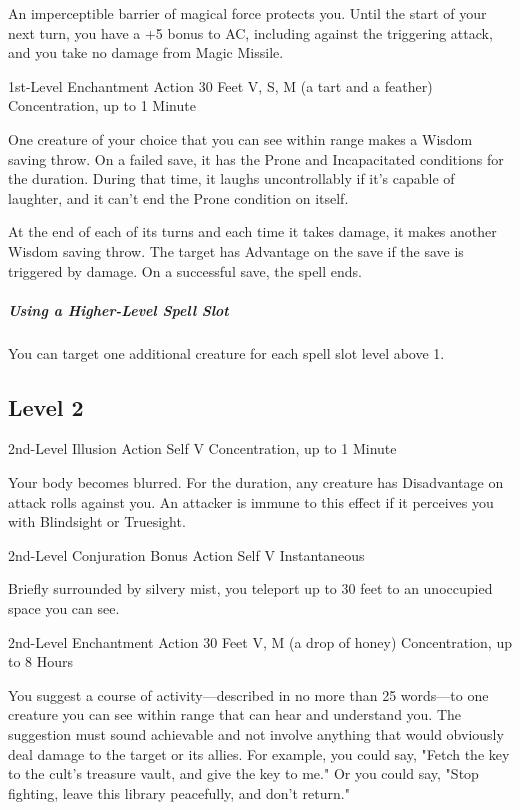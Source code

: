 \documentclass[letterpaper,openany,oneside,twocolumn]{book}
\begin{document}
An imperceptible barrier of magical force protects you. Until the start of your next turn, you have a +5 bonus to AC, including against the triggering attack, and you take no damage from Magic Missile.

	{1st-Level Enchantment}
	{Action}
	{30 Feet}
	{V, S, M (a tart and a feather)}
	{Concentration, up to 1 Minute}

One creature of your choice that you can see within range makes a Wisdom saving throw. On a failed save, it has the Prone and Incapacitated conditions for the duration. During that time, it laughs uncontrollably if it's capable of laughter, and it can't end the Prone condition on itself.

At the end of each of its turns and each time it takes damage, it makes another Wisdom saving throw. The target has Advantage on the save if the save is triggered by damage. On a successful save, the spell ends.

\subparagraph*{Using a Higher-Level Spell Slot} You can target one additional creature for each spell slot level above 1.

\subsection*{Level 2}
	{2nd-Level Illusion}
	{Action}
	{Self}
	{V}
	{Concentration, up to 1 Minute}

Your body becomes blurred. For the duration, any creature has Disadvantage on attack rolls against you. An attacker is immune to this effect if it perceives you with Blindsight or Truesight.

	{2nd-Level Conjuration}
	{Bonus Action}
	{Self}
	{V}
	{Instantaneous}

Briefly surrounded by silvery mist, you teleport up to 30 feet to an unoccupied space you can see.

	{2nd-Level Enchantment}
	{Action}
	{30 Feet}
	{V, M (a drop of honey)}
	{Concentration, up to 8 Hours}

You suggest a course of activity—described in no more than 25 words—to one creature you can see within range that can hear and understand you. The suggestion must sound achievable and not involve anything that would obviously deal damage to the target or its allies. For example, you could say, "Fetch the key to the cult's treasure vault, and give the key to me." Or you could say, "Stop fighting, leave this library peacefully, and don't return."
\end{document}
